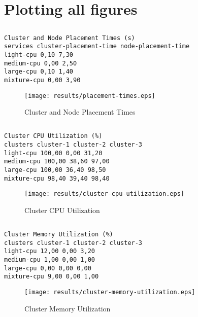 \documentclass{elsart}
\begin{document}
\section{Plotting all figures}
\subsection{}

\begin{lstlisting}[caption={Cluster and Node Placement Times}]
Cluster and Node Placement Times (s)
services cluster-placement-time node-placement-time
light-cpu 0,10 7,30
medium-cpu 0,00 2,50
large-cpu 0,10 1,40
mixture-cpu 0,00 3,90
\end{lstlisting}

\begin{figure}[ht]
\centering
\texttt{[image: results/placement-times.eps]}
\caption{Cluster and Node Placement Times}\label{fig:placement-times.eps}
\end{figure}

\subsection{}

\begin{lstlisting}[caption={Cluster CPU Utilization}]
Cluster CPU Utilization (%)
clusters cluster-1 cluster-2 cluster-3
light-cpu 100,00 0,00 31,20
medium-cpu 100,00 38,60 97,00
large-cpu 100,00 36,40 98,50
mixture-cpu 98,40 39,40 98,40
\end{lstlisting}

\begin{figure}[ht]
\centering
\texttt{[image: results/cluster-cpu-utilization.eps]}
\caption{Cluster CPU Utilization}\label{fig:cluster-cpu-utilization.eps}
\end{figure}

\subsection{}

\begin{lstlisting}[caption={Cluster Memory Utilization}]
Cluster Memory Utilization (%)
clusters cluster-1 cluster-2 cluster-3
light-cpu 12,00 0,00 3,20
medium-cpu 1,00 0,00 1,00
large-cpu 0,00 0,00 0,00
mixture-cpu 9,00 0,00 1,00
\end{lstlisting}

\begin{figure}[ht]
\centering
\texttt{[image: results/cluster-memory-utilization.eps]}
\caption{Cluster Memory Utilization}\label{fig:cluster-memory-utilization.eps}
\end{figure}
\end{document}
